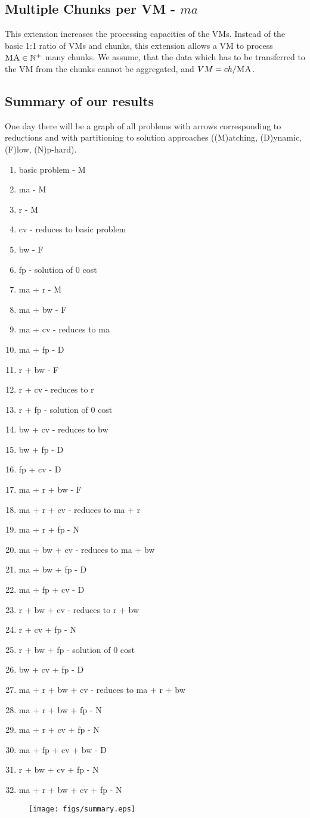 \subsection{Multiple Chunks per VM - $ma$}

This extension increases the processing capacities of the VMs. Instead of the 
basic 1:1 ratio of VMs and chunks, this extension allows a VM to process 
$\textsc{MA} \in \mathbb{N}^+$ many chunks. We assume, that the data which has to 
be transferred to the VM from the chunks cannot be aggregated, and $VM = 
ch / \textsc{MA}$.

\subsection{Summary of our results}

One day there will be a graph of all problems with arrows
corresponding to reductions and with partitioning to solution
approaches ((M)atching, (D)ynamic, (F)low, (N)p-hard).

\begin{enumerate}
\item basic problem - M
\item ma - M
\item r - M
\item cv - reduces to basic problem
\item bw - F
\item fp - solution of 0 cost
\item ma + r - M
\item  ma + bw - F
\item ma + cv - reduces to ma
\item ma + fp - D
\item r + bw - F
\item r + cv - reduces to r
\item r + fp - solution of 0 cost
\item bw + cv - reduces to bw
\item bw + fp - D
\item fp + cv - D
\item ma + r + bw - F
\item ma + r + cv - reduces to ma + r
\item ma + r + fp - N
\item ma + bw + cv - reduces to ma + bw
\item ma + bw + fp - D
\item ma + fp + cv - D
\item r + bw + cv - reduces to r + bw
\item r + cv + fp - N
\item r + bw + fp - solution of 0 cost
\item bw + cv + fp - D
\item ma + r + bw + cv - reduces to ma + r + bw
\item ma + r + bw + fp - N
\item ma + r + cv + fp - N
\item ma + fp + cv + bw - D
\item r + bw + cv + fp - N
\item ma + r + bw + cv + fp - N
\end{enumerate}


\begin{figure}[htbp]
\texttt{[image: figs/summary.eps]}
\end{figure}

